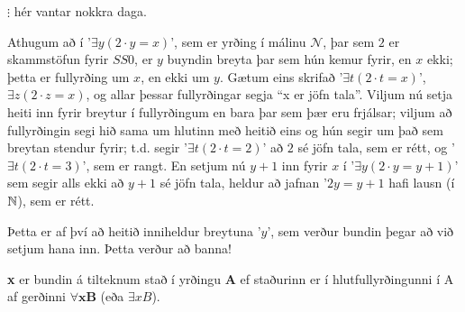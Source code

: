 \documentclass[12pt]{book}
\begin{document}
$\vdots$\: \: \:hér vantar nokkra daga.


Athugum að í '$\exists y (2 \cdot y = x )$', sem er yrðing í málinu $\mathcal{N}$,
þar sem $2$ er skammstöfun fyrir $SS0$, er $y$ buyndin breyta þar sem hún kemur fyrir, en $x$
ekki; þetta er fullyrðing um $x$, en ekki um $y$. Gætum eins skrifað
'$\exists t (2 \cdot t = x )$', $\exists z (2 \cdot z = x )$, og
allar þessar fullyrðingar segja ``x er jöfn tala''. Viljum nú setja heiti inn fyrir
breytur í fullyrðingum en bara þar sem þær eru frjálsar; viljum að fullyrðingin segi
hið sama um hlutinn með heitið eins og hún segir um það sem breytan stendur
fyrir; t.d. segir '$\exists t (2 \cdot t = 2 )$' að $2$ sé jöfn tala, sem er rétt,
og '$\exists t (2 \cdot t = 3 )$', sem er rangt. En setjum nú $y+1$ inn fyrir $x$
í '$\exists y (2 \cdot y = y+1 )$' sem segir alls ekki að $y+1$
sé jöfn tala, heldur að jafnan '$2y = y+1$ hafi lausn (í $\mathbb{N}$), sem er rétt.

Þetta er af því að heitið inniheldur breytuna '$y$', sem verður bundin þegar
að við setjum hana inn. Þetta verður að banna!

\begin{ath}
 \textbf{x} er bundin á tilteknum stað í yrðingu \textbf{A} ef
staðurinn er í hlutfullyrðingunni í A af gerðinni
$\forall \mathbf{x} \mathbf{B}$ (eða $\exists x B$).
\end{ath}
\end{document}
